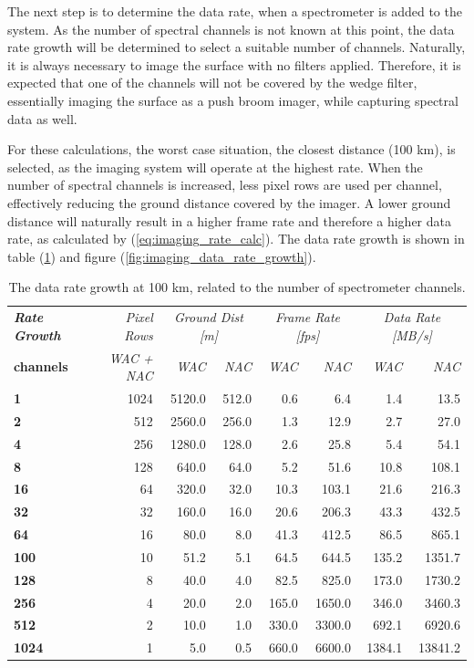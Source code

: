 The next step is to determine the data rate, when a spectrometer is added to the system. As the number of spectral channels is not known at this point, the data rate growth will be determined to select a suitable number of channels. Naturally, it is always necessary to image the surface with no filters applied. Therefore, it is expected that one of the channels will not be covered by the wedge filter, essentially imaging the surface as a push broom imager, while capturing spectral data as well.

For these calculations, the worst case situation, the closest distance (100 km), is selected, as the imaging system will operate at the highest rate. When the number of spectral channels is increased, less pixel rows are used per channel, effectively reducing the ground distance covered by the imager. A lower ground distance will naturally result in a higher frame rate and therefore a higher data rate, as calculated by (\ref{eq:imaging_rate_calc}). The data rate growth is shown in table (\ref{tab:imaging_data_rate_growth}) and figure (\ref{fig:imaging_data_rate_growth}).
\begin{table}[h!]
  \centering
    \begin{tabular}{l|r|r|r|r|r|r|r|}
\textit{\textbf{Rate Growth}} & \textit{Pixel Rows} & \multicolumn{2}{c|}{\textit{Ground Dist [m]}} & \multicolumn{2}{c|}{\textit{Frame Rate [fps]}} & \multicolumn{2}{c}{\textit{Data Rate [MB/s]}} \bigstrut[b]\\
\cline{1-1}\textbf{channels} & \textit{WAC + NAC} & \textit{WAC} & \textit{NAC} & \textit{WAC} & \textit{NAC} & \textit{WAC} & \multicolumn{1}{r}{\textit{NAC}} \bigstrut\\
\hline
\textbf{1} & 1024  & 5120.0 & 512.0 & 0.6   & 6.4   & 1.4   & 13.5 \bigstrut[t]\\
\textbf{2} & 512   & 2560.0 & 256.0 & 1.3   & 12.9  & 2.7   & 27.0 \\
\textbf{4} & 256   & 1280.0 & 128.0 & 2.6   & 25.8  & 5.4   & 54.1 \\
\textbf{8} & 128   & 640.0 & 64.0  & 5.2   & 51.6  & 10.8  & 108.1 \\
\textbf{16} & 64    & 320.0 & 32.0  & 10.3  & 103.1 & 21.6  & 216.3 \\
\textbf{32} & 32    & 160.0 & 16.0  & 20.6  & 206.3 & 43.3  & 432.5 \\
\textbf{64} & 16    & 80.0  & 8.0   & 41.3  & 412.5 & 86.5  & 865.1 \\
\textbf{100} & 10    & 51.2  & 5.1   & 64.5  & 644.5 & 135.2 & 1351.7 \\
\textbf{128} & 8     & 40.0  & 4.0   & 82.5  & 825.0 & 173.0 & 1730.2 \\
\textbf{256} & 4     & 20.0  & 2.0   & 165.0 & 1650.0 & 346.0 & 3460.3 \\
\textbf{512} & 2     & 10.0  & 1.0   & 330.0 & 3300.0 & 692.1 & 6920.6 \\
\textbf{1024} & 1     & 5.0   & 0.5   & 660.0 & 6600.0 & 1384.1 & 13841.2 \\
\end{tabular}%
    \caption{The data rate growth at 100 km, related to the number of spectrometer channels.}
  \label{tab:imaging_data_rate_growth}%
\end{table}%
